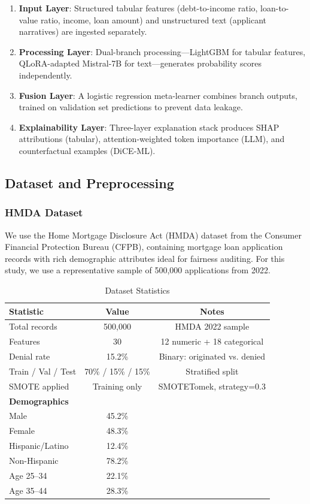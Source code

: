 \documentclass[11pt,a4paper]{article}
\begin{document}
\begin{enumerate}
    \item \textbf{Input Layer}: Structured tabular features (debt-to-income ratio, loan-to-value ratio, income, loan amount) and unstructured text (applicant narratives) are ingested separately.
    
    \item \textbf{Processing Layer}: Dual-branch processing---LightGBM for tabular features, QLoRA-adapted Mistral-7B for text---generates probability scores independently.
    
    \item \textbf{Fusion Layer}: A logistic regression meta-learner combines branch outputs, trained on validation set predictions to prevent data leakage.
    
    \item \textbf{Explainability Layer}: Three-layer explanation stack produces SHAP attributions (tabular), attention-weighted token importance (LLM), and counterfactual examples (DiCE-ML).
\end{enumerate}

\subsection{Dataset and Preprocessing}

\subsubsection{HMDA Dataset}

We use the Home Mortgage Disclosure Act (HMDA) dataset from the Consumer Financial Protection Bureau (CFPB), containing mortgage loan application records with rich demographic attributes ideal for fairness auditing. For this study, we use a representative sample of 500,000 applications from 2022.

\begin{table}[H]
\centering
\caption{Dataset Statistics}
\label{tab:dataset}
\begin{tabular}{lcc}
\toprule
\textbf{Statistic} & \textbf{Value} & \textbf{Notes} \\
\midrule
Total records & 500,000 & HMDA 2022 sample \\
Features & 30 & 12 numeric + 18 categorical \\
Denial rate & 15.2\% & Binary: originated vs. denied \\
Train / Val / Test & 70\% / 15\% / 15\% & Stratified split \\
SMOTE applied & Training only & SMOTETomek, strategy=0.3 \\
\midrule
\textbf{Demographics} & & \\
\quad Male & 45.2\% & \\
\quad Female & 48.3\% & \\
\quad Hispanic/Latino & 12.4\% & \\
\quad Non-Hispanic & 78.2\% & \\
\quad Age 25--34 & 22.1\% & \\
\quad Age 35--44 & 28.3\% & \\
\bottomrule
\end{tabular}
\end{table}
\end{document}
